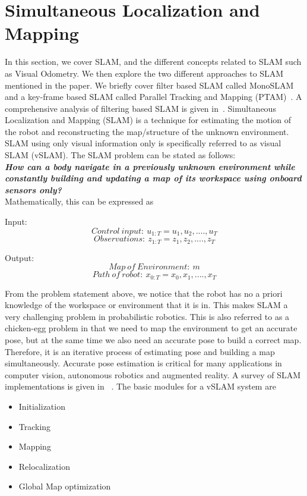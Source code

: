 \section{Simultaneous Localization and Mapping}
\label{slam}

In this section, we cover SLAM, and the different concepts related to SLAM such as Visual Odometry. We then explore the two different approaches to SLAM mentioned in the paper. We briefly cover filter based SLAM called MonoSLAM~\cite{davison2007monoslam} and a key-frame based SLAM called Parallel Tracking and Mapping (PTAM)~\cite{klein2007parallel}. A comprehensive analysis of filtering based SLAM is given in~\cite{strasdatavisual}. Simultaneous Localization and Mapping (SLAM) is a technique for estimating the motion of the robot and reconstructing the map/structure of the unknown environment. SLAM using only visual information only is specifically referred to as visual SLAM (vSLAM). The SLAM problem can be stated as follows:\\

\textbf{\emph{How can a body navigate in a previously unknown environment while constantly building and updating a map of its workspace using onboard sensors only?} ~\cite{chli2017}}\\

Mathematically, this can be expressed as~\cite{cyrillslam}

Input:\
\begin{equation}
Control\ input:\ u_{1:T} = {u_1, u_2, ...., u_T}
\end{equation}
\begin{equation}
Observations:\ z_{1:T} = {z_1, z_2, ...., z_T}
\end{equation}

Output:\
\begin{equation}
Map\ of\ Environment:\ m
\end{equation}
\begin{equation}
Path\ of\ robot:\ x_{0:T} = {x_0, x_1, ...., x_T}
\end{equation}

From the problem statement above, we notice that the robot has no a priori knowledge of the workspace or environment that it is in. This makes SLAM a very challenging problem in probabilistic robotics. This is also referred to as a chicken-egg problem in that we need to map the environment to get an accurate pose, but at the same time we also need an accurate pose to build a correct map. Therefore, it is an iterative process of estimating pose and building a map simultaneously. Accurate pose estimation is critical for many applications in computer vision, autonomous robotics and augmented reality. A survey of SLAM implementations is given in ~\cite{bresson2017simultaneous,cadena2016past,taketomi2017visual}. The basic modules for a vSLAM system are
\begin{itemize}
\item Initialization
\item Tracking
\item Mapping
\item Relocalization
\item Global Map optimization
\end{itemize}

